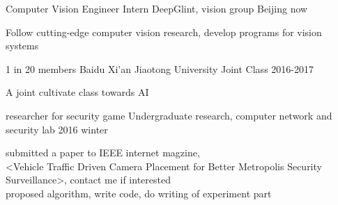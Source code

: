 

\begin{cventries}
  \cventry
    {Computer Vision Engineer Intern} %
    {DeepGlint, vision group} %
    {Beijing} %
    {now} %
    {
      \begin{cvitems} %
        \item {Follow cutting-edge computer vision research, develop programs 
for vision systems}
      \end{cvitems}
    }
    
  \cventry
    {1 in 20 members} %
    {Baidu Xi'an Jiaotong University Joint Class} %
    { } %
    {2016-2017} %
    {
      \begin{cvitems} %
        \item {A joint cultivate class towards AI}
      \end{cvitems}
    }
    
  \cventry
    {researcher for security game} %
    {Undergraduate research, computer network and security lab} %
    { } %
    {2016 winter} %
    {
      \begin{cvitems} %
        \item {submitted a paper to IEEE internet magzine,\\
        <Vehicle Traffic Driven Camera Placement for Better Metropolis Security Surveillance>, contact me if interested\\
        proposed algorithm, write code, do writing of experiment part}
      \end{cvitems}
    }



\end{cventries}
